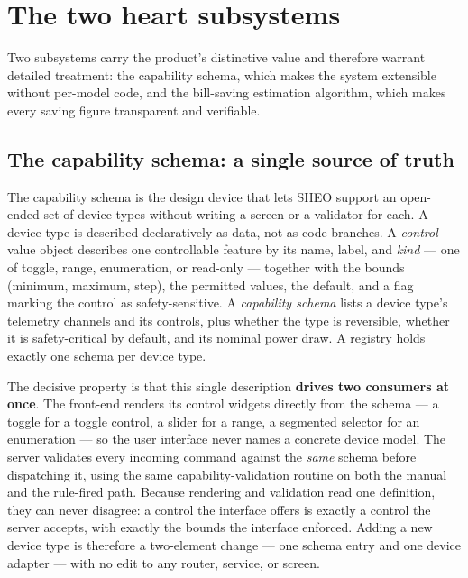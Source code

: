 
\section{The two heart subsystems}
\label{sec:heart}

Two subsystems carry the product's distinctive value and therefore warrant detailed
treatment: the capability schema, which makes the system extensible without
per-model code, and the bill-saving estimation algorithm, which makes every saving
figure transparent and verifiable.

\subsection{The capability schema: a single source of truth}

The capability schema is the design device that lets SHEO support an open-ended set of
device types without writing a screen or a validator for each. A device type is
described declaratively as data, not as code branches. A \emph{control} value object
describes one controllable feature by its name, label, and \emph{kind} --- one of
toggle, range, enumeration, or read-only --- together with the bounds (minimum,
maximum, step), the permitted values, the default, and a flag marking the control as
safety-sensitive. A \emph{capability schema} lists a device type's telemetry channels
and its controls, plus whether the type is reversible, whether it is safety-critical by
default, and its nominal power draw. A registry holds exactly one schema per device
type.

The decisive property is that this single description \textbf{drives two consumers at
once}. The front-end renders its control widgets directly from the schema --- a toggle
for a toggle control, a slider for a range, a segmented selector for an enumeration
--- so the user interface never names a concrete device model. The server validates
every incoming command against the \emph{same} schema before dispatching it, using
the same capability-validation routine on both the manual and the rule-fired path.
Because rendering and validation read one definition, they can never disagree: a
control the interface offers is exactly a control the server accepts, with exactly the
bounds the interface enforced. Adding a new device type is therefore a two-element
change --- one schema entry and one device adapter --- with no edit to any router,
service, or screen.

